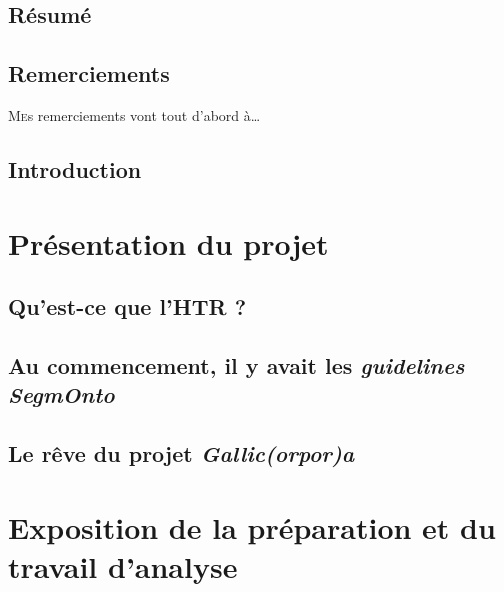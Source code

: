 \documentclass[a4paper,12pt,twoside]{book}
\begin{document}
	\frontmatter
	\cleardoublepage
	
	\chapter{Résumé}
	
	
	
	\chapter{Remerciements}
	\lettrine{M}es remerciements vont tout d'abord à\dots
	
	
	\chapter{Introduction}
	
	
	\thispagestyle{empty}
	\cleardoublepage
	
	\mainmatter
	
	\part{Présentation du projet}
	
	\chapter{Qu'est-ce que l'HTR ?}
	
	
	\chapter{Au commencement, il y avait les \textit{guidelines SegmOnto}}
	

	\chapter{Le rêve du projet \textit{Gallic(orpor)a}}
	
	
	\part{Exposition de la préparation et du travail d'analyse}
\end{document}

